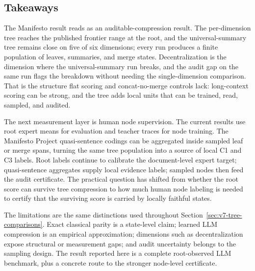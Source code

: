 \clearpage

\subsection{Takeaways}\label{sec:min-manifesto-takeaways}

The Manifesto result reads as an auditable-compression result. The
per-dimension tree reaches the published frontier range at the root, and
the universal-summary tree remains close on five of six dimensions; every
run produces a finite population of leaves, summaries, and merge states.
Decentralization is the dimension where the universal-summary run breaks,
and the audit gap on the same run flags the breakdown without needing the
single-dimension comparison. That is the structure flat scoring and
concat-no-merge controls lack: long-context scoring can be strong, and the
tree adds local units that can be trained, read, sampled, and audited.

The next measurement layer is human node supervision. The current results
use root expert means for evaluation and teacher traces for node training.
The Manifesto Project quasi-sentence codings can be aggregated inside
sampled leaf or merge spans, turning the same tree population into a source
of local C1 and C3 labels. Root labels continue to calibrate the
document-level expert target; quasi-sentence aggregates supply local
evidence labels; sampled nodes then feed the audit certificate. The
practical question has shifted from whether the root score can survive tree
compression to how much human node labeling is needed to certify that the
surviving score is carried by locally faithful states.

The limitations are the same distinctions used throughout
Section~\ref{sec:v7-tree-comparisons}. Exact classical parity is a
state-level claim; learned LLM compression is an empirical approximation;
dimensions such as decentralization expose structural or measurement gaps;
and audit uncertainty belongs to the sampling design. The result reported
here is a complete root-observed LLM benchmark, plus a concrete route to the
stronger node-level certificate.
